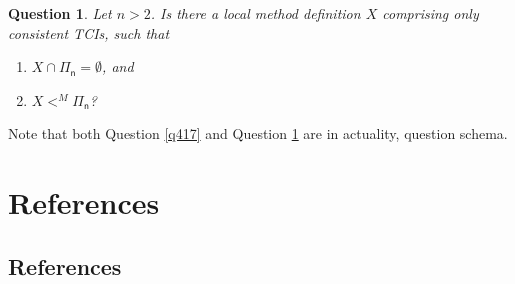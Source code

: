 \documentclass[12pt, twoside]{memoir}
\numberwithin{equation}{section}
\newtheorem{ques}[thm]{Question}
\theoremstyle{definition}
\theoremstyle{remark}
\theoremstyle{definition}
\theoremstyle{definition}
\theoremstyle{definition}
\theoremstyle{remark}
\newcommand{\blankpage}{
\newpage
\thispagestyle{empty}
\mbox{}
\newpage
}
\begin{document}
\begin{ques}\label{q418}
Let $n > 2$. Is there a local method definition $X$ comprising only consistent TCIs, such that
\begin{enumerate}[label=(\arabic*)]
    \item $X \cap \mathsf{\Pi_n} = \emptyset$, and
    \item $X <^M \mathsf{\Pi_n}$?
\end{enumerate}
\end{ques}

Note that both Question \ref{q417} and Question \ref{q418} are in actuality, question schema.

\blankpage

\part{References}

\chapter{References}
\printbibliography[heading=none]
\end{document}
